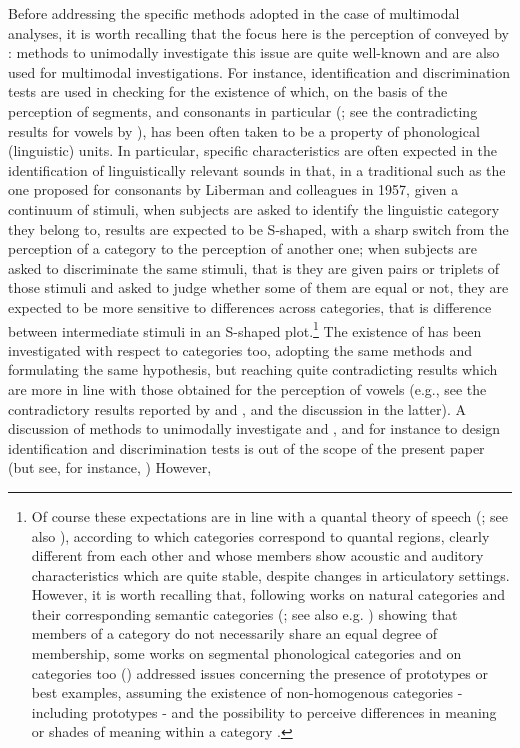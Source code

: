 \documentclass[output=paper]{langsci/langscibook}
\begin{document}
Before addressing the specific methods adopted in the case of multimodal analyses, it is worth recalling that the focus here is the perception of  conveyed by : methods to unimodally investigate this issue are quite well-known and are also used for multimodal investigations. For instance, identification and discrimination tests are used in checking for the existence of  which, on the basis of the perception of segments, and consonants in particular (\citealt{Liberman1957}; see the contradicting results for vowels by \citealt{FryDB1962}), has been often taken to be a property of phonological (linguistic) units. In particular, specific characteristics are often expected in the identification of linguistically relevant sounds in that, in a traditional  such as the one proposed for consonants by Liberman and colleagues in 1957, given a continuum of stimuli, when subjects are asked to identify the linguistic category they belong to, results are expected to be S-shaped, with a sharp switch from the perception of a category to the perception of another one; when subjects are asked to discriminate the same stimuli, that is they are given pairs or triplets of those stimuli and asked to judge whether some of them are equal or not, they are expected to be more sensitive to differences across categories, that is difference between intermediate stimuli in an S-shaped plot.\footnote{Of course these expectations are in line with a quantal theory of speech (\citealt{Stevens1972,Stevens1989}; see also \citealt{Stevens2010}), according to which categories correspond to quantal regions, clearly different from each other and whose members show acoustic and auditory characteristics which are quite stable, despite changes in articulatory settings. However, it is worth recalling that, following works on natural categories and their corresponding semantic categories (\citealt[193]{Rosch1975}; see also e.g. \citealt{Berlin1969}) showing that members of a category do not necessarily share an equal degree of membership, some works on segmental phonological categories \citep{Kuhl1991} and on  categories too (\citealt{SchneiderEtAl2006,Schneider2009,GiliFivela2012}) addressed issues concerning the presence of prototypes or best examples, assuming the existence of non-homogenous categories - including prototypes - and the possibility to perceive differences in meaning or shades of meaning within a category \citep{GiliFivela2012}.} The existence of  has been investigated with respect to  categories too, adopting the same methods and formulating the same hypothesis, but reaching quite contradicting results which are more in line with those obtained for the perception of vowels (e.g., see the contradictory results reported by \citealt{Vanrell2006,SchneiderEtAl2006} and \citealt{Niebuhr2004}, and the discussion in the latter). A discussion of methods to unimodally investigate  and , and for instance to design identification and discrimination tests is out of the scope of the present paper (but see, for instance, \citealt{Gussenhoven1999discreteness.gradience,Gussenhoven2004,GiliFivela2008book,Prieto.2012}) However, 
\end{document}
